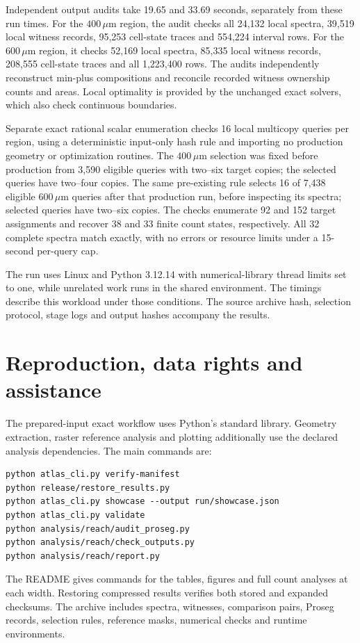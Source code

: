 \documentclass[10pt,letterpaper]{article}
\begin{document}
Independent output audits take 19.65 and 33.69 seconds, separately from these run times. For the $400\,\mu\mathrm m$ region, the audit checks all 24,132 local spectra, 39,519 local witness records, 95,253 cell-state traces and 554,224 interval rows. For the $600\,\mu\mathrm m$ region, it checks 52,169 local spectra, 85,335 local witness records, 208,555 cell-state traces and all 1,223,400 rows. The audits independently reconstruct min-plus compositions and reconcile recorded witness ownership counts and areas. Local optimality is provided by the unchanged exact solvers, which also check continuous boundaries.

Separate exact rational scalar enumeration checks 16 local multicopy queries per region, using a deterministic input-only hash rule and importing no production geometry or optimization routines. The $400\,\mu\mathrm m$ selection was fixed before production from 3,590 eligible queries with two--six target copies; the selected queries have two--four copies. The same pre-existing rule selects 16 of 7,438 eligible $600\,\mu\mathrm m$ queries after that production run, before inspecting its spectra; selected queries have two--six copies. The checks enumerate 92 and 152 target assignments and recover 38 and 33 finite count states, respectively. All 32 complete spectra match exactly, with no errors or resource limits under a 15-second per-query cap.

The run uses Linux and Python 3.12.14 with numerical-library thread limits set to one, while unrelated work runs in the shared environment. The timings describe this workload under those conditions. The source archive hash, selection protocol, stage logs and output hashes accompany the results.

\FloatBarrier

\FloatBarrier
\section{Reproduction, data rights and assistance}
The prepared-input exact workflow uses Python's standard library. Geometry extraction, raster reference analysis and plotting additionally use the declared analysis dependencies. The main commands are:
\begin{verbatim}
python atlas_cli.py verify-manifest
python release/restore_results.py
python atlas_cli.py showcase --output run/showcase.json
python atlas_cli.py validate
python analysis/reach/audit_proseg.py
python analysis/reach/check_outputs.py
python analysis/reach/report.py
\end{verbatim}
The README gives commands for the tables, figures and full count analyses at each width. Restoring compressed results verifies both stored and expanded checksums. The archive includes spectra, witnesses, comparison pairs, Proseg records, selection rules, reference masks, numerical checks and runtime environments.
\end{document}
